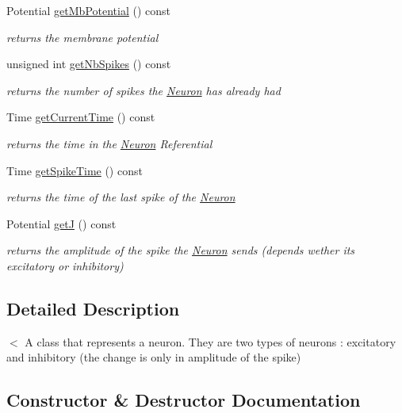 \begin{DoxyCompactItemize}
Potential \hyperlink{classNeuron_a7b0a9570b046fbb67e091d46104c6edc}{get\+Mb\+Potential} () const 
\begin{DoxyCompactList}\small\item\em returns the membrane potential \end{DoxyCompactList}\item 
unsigned int \hyperlink{classNeuron_a080fe09731808e0b8210713a7e3fdc3a}{get\+Nb\+Spikes} () const 
\begin{DoxyCompactList}\small\item\em returns the number of spikes the \hyperlink{classNeuron}{Neuron} has already had \end{DoxyCompactList}\item 
Time \hyperlink{classNeuron_a79e23734d7cd15d93db681f06df18293}{get\+Current\+Time} () const 
\begin{DoxyCompactList}\small\item\em returns the time in the \hyperlink{classNeuron}{Neuron} Referential \end{DoxyCompactList}\item 
Time \hyperlink{classNeuron_a69a6370d2c8aa4105d30f543bf8dac00}{get\+Spike\+Time} () const 
\begin{DoxyCompactList}\small\item\em returns the time of the last spike of the \hyperlink{classNeuron}{Neuron} \end{DoxyCompactList}\item 
Potential \hyperlink{classNeuron_a4f92588d104d30c752492e72ee210df8}{getJ} () const 
\begin{DoxyCompactList}\small\item\em returns the amplitude of the spike the \hyperlink{classNeuron}{Neuron} sends (depends wether it\textquotesingle{}s excitatory or inhibitory) \end{DoxyCompactList}\end{DoxyCompactItemize}


\subsection{Detailed Description}
$<$ A class that represents a neuron. They are two types of neurons \+: excitatory and inhibitory (the change is only in amplitude of the spike) 

\subsection{Constructor \& Destructor Documentation}
